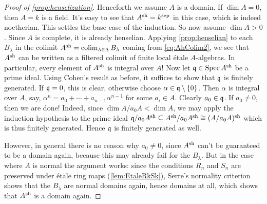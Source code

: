 \begin{proof}[Proof of \cref{prop:henselization}]
	Henceforth we assume $A$ is a domain. If $\dim A=0$, then $A=k$ is a field. It's easy to see that $A^{\mathrm{sh}}=k^{\mathrm{sep}}$ in this case, which is indeed noetherian. This settles the base case of the induction. So now assume $\dim A>0$. Since $A$ is complete, it is already henselian. Applying \cref{prop:henselian} to each $B_\lambda$ in the colimit $A^{\mathrm{sh}}=\operatorname*{colim}_{\lambda\in\Lambda}B_\lambda$ coming from \cref{eq:AhColim2}, we see that $A^{\mathrm{sh}}$ can be written as a filtered colimit of finite local étale $A$-algebras. In particular, every element of $A^{\mathrm{sh}}$ is integral over $A$! Now let $\mathfrak{q}\in\operatorname{Spec} A^{\mathrm{sh}}$ be a prime ideal. Using Cohen's result as before, it suffices to show that $\mathfrak{q}$ is finitely generated. If $\mathfrak{q}=0$, this is clear, otherwise choose $\alpha\in\mathfrak{q}\setminus\{0\}$. Then $\alpha$ is integral over $A$, say, $\alpha^n=a_0+\dotsb+a_{n-1}\alpha^{n-1}$ for some $a_i\in A$. Clearly $a_0\in\mathfrak{q}$. If $a_0\neq 0$, then we are done! Indeed, since $\dim A/a_0A<\dim A$, we may apply the induction hypothesis to the prime ideal $\mathfrak{q}/a_0A^{\mathrm{sh}}\subseteq A^{\mathrm{sh}}/a_0A^{\mathrm{sh}}\cong (A/a_0A)^{\mathrm{sh}}$ which is thus finitely generated. Hence $\mathfrak{q}$ is finitely generated as well.
	
	However, in general there is no reason why $a_0\neq 0$, since $A^{\mathrm{sh}}$ can't be guaranteed to be a domain again, because this may already fail for the $B_\lambda$. But in the case where $A$ is normal the argument works: since the conditions $R_n$ and $S_n$ are preserved under étale ring maps (\cref{lem:EtaleRkSk}), Serre's normality criterion shows that the $B_\lambda$ are normal domains again, hence domains at all, which shows that $A^{\mathrm{sh}}$ is a domain again.
	

\end{proof}
